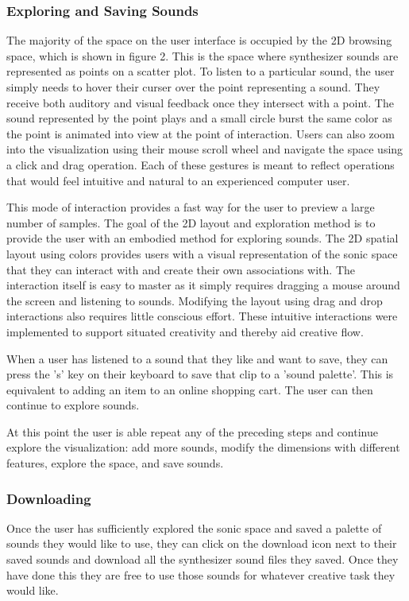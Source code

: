 \subsubsection{Exploring and Saving Sounds}
The majority of the space on the user interface is occupied by the 2D browsing space, which is shown in figure 2. This is the space where synthesizer sounds are represented as points on a scatter plot. To listen to a particular sound, the user simply needs to hover their curser over the point representing a sound. They receive both auditory and visual feedback once they intersect with a point. The sound represented by the point plays and a small circle burst the same color as the point is animated into view at the point of interaction. Users can also zoom into the visualization using their mouse scroll wheel and navigate the space using a click and drag operation. Each of these gestures is meant to reflect operations that would feel intuitive and natural to an experienced computer user.

This mode of interaction provides a fast way for the user to preview a large number of samples. The goal of the 2D layout and exploration method is to provide the user with an embodied method for exploring sounds. The 2D spatial layout using colors provides users with a visual representation of the sonic space that they can interact with and create their own associations with. The interaction itself is easy to master as it simply requires dragging a mouse around the screen and listening to sounds. Modifying the layout using drag and drop interactions also requires little conscious effort. These intuitive interactions were implemented to support situated creativity and thereby aid creative flow.

When a user has listened to a sound that they like and want to save, they can press the 's' key on their keyboard to save that clip to a 'sound palette'. This is equivalent to adding an item to an online shopping cart. The user can then continue to explore sounds.

At this point the user is able repeat any of the preceding steps and continue explore the visualization: add more sounds, modify the dimensions with different features, explore the space, and save sounds.

\subsubsection{Downloading}
Once the user has sufficiently explored the sonic space and saved a palette of sounds they would like to use, they can click on the download icon next to their saved sounds and download all the synthesizer sound files they saved. Once they have done this they are free to use those sounds for whatever creative task they would like.

